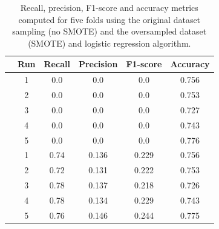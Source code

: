 \begin{table}[H]
\centering \begin{tabular}{c|ccccc}
& \textbf{Run} & \textbf{Recall} & \textbf{Precision} & \textbf{F1-score} & \textbf{Accuracy}\\\hline \hline
\parbox[t]{2mm}{} 
& 1 & 0.0  &  0.0 & 0.0 & 0.756 \\
& 2 & 0.0  & 0.0  & 0.0  & 0.753 \\
& 3 & 0.0  & 0.0  & 0.0  & 0.727 \\
& 4 & 0.0  & 0.0  & 0.0  & 0.743 \\
& 5 & 0.0  & 0.0  & 0.0  & 0.776 \\ \hline
\parbox[t]{2mm}{} 
& 1 & 0.74 & 0.136 & 0.229 & 0.756 \\
& 2 & 0.72 & 0.131 & 0.222 & 0.753 \\
& 3 & 0.78 & 0.137 & 0.218 & 0.726 \\
& 4 & 0.78 & 0.134 & 0.229 & 0.743 \\
& 5 & 0.76 & 0.146 & 0.244 & 0.775 \\
\end{tabular}
\caption{Recall, precision, F1-score and accuracy metrics computed for five folds using the original dataset sampling (no SMOTE) and the oversampled dataset (SMOTE) and logistic regression algorithm.}
\label{table_LR}
\end{table}

